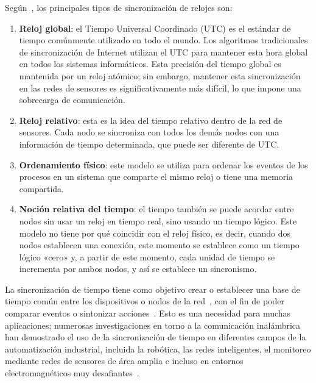 Según~\cite{tavares2017}, los principales tipos de sincronización de relojes son:

\begin{enumerate}
\item \textbf{Reloj global}: el Tiempo Universal Coordinado (UTC) es el estándar de tiempo comúnmente utilizado en todo el mundo. Los algoritmos tradicionales de sincronización de Internet utilizan el UTC para mantener esta hora global en todos los sistemas informáticos. Esta precisión del tiempo global es mantenida por un reloj atómico; sin embargo, mantener esta sincronización en las redes de sensores es significativamente más difícil, lo que impone una sobrecarga de comunicación.

\item \textbf{Reloj relativo}: esta es la idea del tiempo relativo dentro de la red de sensores. Cada nodo se sincroniza con todos los demás nodos con una información de tiempo determinada, que puede ser diferente de UTC.

\item \textbf{Ordenamiento físico}: este modelo se utiliza para ordenar los eventos de los procesos en un sistema que comparte el mismo reloj o tiene una memoria compartida.

\item \textbf{Noción relativa del tiempo}: el tiempo también se puede acordar entre nodos sin usar un reloj en tiempo real, sino usando un tiempo lógico. Este modelo no tiene por qué coincidir con el reloj físico, es decir, cuando dos nodos establecen una conexión, este momento se establece como un tiempo lógico «cero» y, a partir de este momento, cada unidad de tiempo se incrementa por ambos nodos, y así se establece un sincronismo.
\end{enumerate}

La sincronización de tiempo tiene como objetivo crear o establecer una base de tiempo común entre los dispositivos o nodos de la red~\cite{lasassmeh2010,tirado2019a,lenzen2015}, con el fin de poder comparar eventos o sintonizar acciones~\cite{krummacker2020,tirado2019b}. Esto es una necesidad para muchas aplicaciones; numerosas investigaciones en torno a la comunicación inalámbrica han demostrado el uso de la sincronización de tiempo en diferentes campos de la automatización industrial, incluida la robótica, las redes inteligentes, el monitoreo mediante redes de sensores de área amplia e incluso en entornos electromagnéticos muy desafiantes~\cite{romanov2021}.

